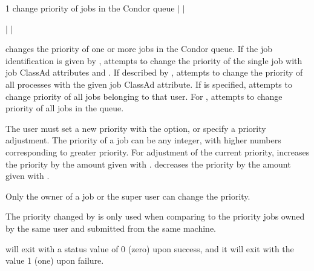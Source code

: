 \begin{ManPage}{\label{man-condor-prio}}{1}
{change priority of jobs in the Condor queue} 
\Synopsis {}
 $|$  $|$ 

 $|$  $|$ 
\Lbr {}   \Rbr
{}


\Description

 changes the priority of one or more jobs in the Condor queue.
If the job identification is given by ,
 attempts to change the priority of the single job
with job ClassAd attributes  and .
If described by ,
 attempts to change the priority of all processes with the
given  job ClassAd attribute.
If  is specified,  attempts to change priority
of all jobs belonging to that user.
For ,  attempts to change priority of
all jobs in the queue.

The user must set a new priority with the  option,
or specify a priority adjustment. 
The priority of a job can be any integer, with higher numbers
corresponding to greater priority.
For adjustment of the current priority,
 increases the priority by the amount given with .
 decreases the priority by the amount given with .

Only the owner of a job or the super user can change the priority.

The priority changed by  is only used when
comparing to the priority
jobs owned by the same user and submitted from the same machine.

\begin{Options}
\end{Options}

\ExitStatus

 will exit with a status value of 0 (zero) upon success,
and it will exit with the value 1 (one) upon failure.

\end{ManPage}
